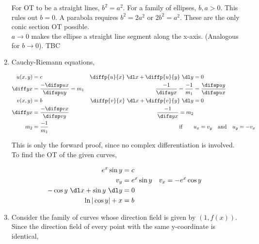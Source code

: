 \begin{enumerate}
          For OT to be a straight lines, $ b^{2} = a^{2} $. For a family of ellipses, $ b, a > 0 $.
          This rules out $ b = 0 $. A parabola requires $ b^{2} = 2a^{2} $ or $ 2b^{2} = a^{2} $. These
          are the only conic section OT possible.\\
          $ a \rightarrow 0 $ makes the ellipse a straight line segment along the x-axis. (Analogous
          for $ b \rightarrow 0 $). TBC

    \item Cauchy-Riemann equations,

          \begin{align}
              u(x, y)  & = c                                    & \diffp{u}{x}\ \dl x + \diffp{u}{y}\ \dl y & = 0                                                 \\
              \diff yx & = \frac{-\difsp ux}{\difsp uy} = m_{1} & \frac{-1}{\difs yx} = \frac{-1}{m_{1}}    & = \frac{\difsp uy}{\difsp ux}                       \\
              v(x, y)  & = b                                    & \diffp{v}{x}\ \dl x + \diffp{v}{y}\ \dl y & = 0                                                 \\
              \diff yx & = \frac{-\difsp vx}{\difsp vy}         & \frac{-1}{\difs yx} = m_{2}                                                                     \\
              m_{2}    & = \frac{-1}{m_{1}}                     & \text{if} \qquad                          & u_{x} = v_{y} \quad \text{and} \quad u_{y} = -v_{x}
          \end{align}

          This is only the forward proof, since no complex differentiation is involved. \\
          To find the OT of the given curves,

          \begin{align}
              e^{x}\sin y                    & = c                                    \\
              v_{y}                          & = e^{x}\sin y & v_{x} & = -e^{x}\cos y \\
              -\cos y\ \dl x + \sin y\ \dl y & = 0                                    \\
              \ln |\cos y| + x               & = b
          \end{align}


    \item Consider the family of curves whose direction field is given by $ (1, f(x)) $.
          Since the direction field of every point with the same y-coordinate is identical,


\end{enumerate}
